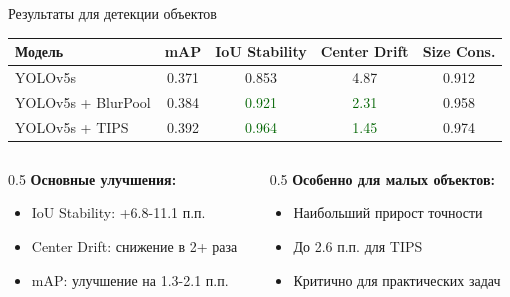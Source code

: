 \documentclass[aspectratio=169]{beamer}
\begin{document}
\begin{frame}{Результаты для детекции объектов}
    \begin{table}[h]
    \centering
    \small
    \begin{tabular}{|l|c|c|c|c|}
    \hline
    \textbf{Модель} & \textbf{mAP} & \textbf{IoU Stability} & \textbf{Center Drift} & \textbf{Size Cons.} \\
    \hline
    YOLOv5s & 0.371 & 0.853 & 4.87 & 0.912 \\
         YOLOv5s + BlurPool & 0.384 & \textcolor{darkgreen}{0.921} & \textcolor{darkgreen}{2.31} & 0.958 \\
     YOLOv5s + TIPS & 0.392 & \textcolor{darkgreen}{0.964} & \textcolor{darkgreen}{1.45} & 0.974 \\
    \hline
    \end{tabular}
    \end{table}
    
    \vspace{0.3cm}
    
    \begin{columns}
        \begin{column}{0.5\textwidth}
            \textbf{Основные улучшения:}
            \begin{itemize}
                \item IoU Stability: +6.8-11.1 п.п.
                \item Center Drift: снижение в 2+ раза
                \item mAP: улучшение на 1.3-2.1 п.п.
            \end{itemize}
        \end{column}
        \begin{column}{0.5\textwidth}
            \textbf{Особенно для малых объектов:}
            \begin{itemize}
                \item Наибольший прирост точности
                \item До 2.6 п.п. для TIPS
                \item Критично для практических задач
            \end{itemize}
        \end{column}
    \end{columns}
\end{frame}
\end{document}
